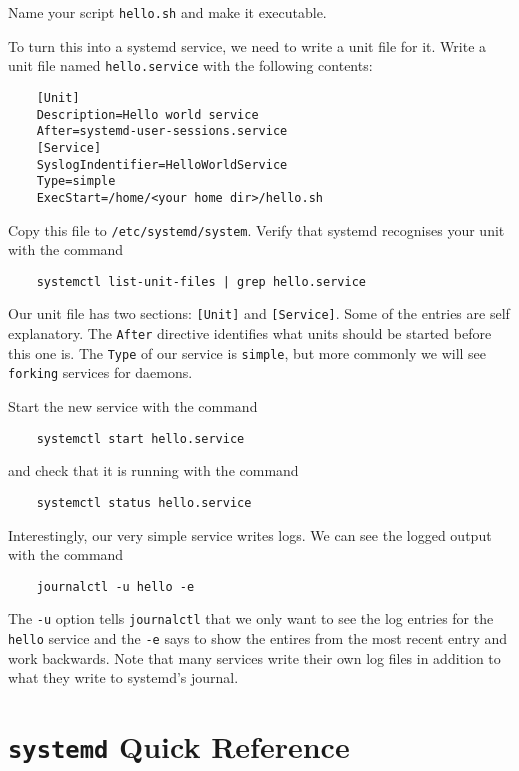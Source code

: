 \documentclass{article}
\begin{document}
Name your script \texttt{hello.sh} and make it executable.

To turn this into a systemd service, we need to write a unit file for it. Write a unit file named \texttt{hello.service} with the following contents:

\begin{verbatim}
    [Unit]
    Description=Hello world service
    After=systemd-user-sessions.service
    [Service]
    SyslogIndentifier=HelloWorldService
    Type=simple
    ExecStart=/home/<your home dir>/hello.sh
\end{verbatim}

Copy this file to \texttt{/etc/systemd/system}. Verify that systemd recognises your unit with the command
\begin{verbatim}
    systemctl list-unit-files | grep hello.service
\end{verbatim}

Our unit file has two sections: \texttt{[Unit]} and \texttt{[Service]}. Some of the entries are self explanatory. The \texttt{After} directive identifies what units should be started before this one is. The \texttt{Type} of our service is \texttt{simple}, but more commonly we will see \texttt{forking} services for daemons.

Start the new service with the command 

\begin{verbatim}
    systemctl start hello.service
\end{verbatim}

and check that it is running with the command

\begin{verbatim}
    systemctl status hello.service
\end{verbatim}

Interestingly, our very simple service writes logs. We can see the logged output with the command

\begin{verbatim}
    journalctl -u hello -e
\end{verbatim}

The \texttt{-u} option tells \texttt{journalctl} that we only want to see the log entries for the \texttt{hello} service and the \texttt{-e} says to show the entires from the most recent entry and work backwards. Note that many services write their own log files in addition to what they write to systemd's journal.

\section{\texttt{systemd} Quick Reference}
\end{document}
